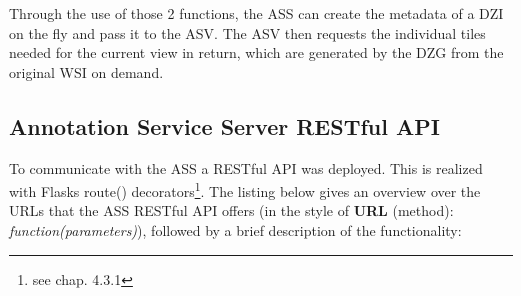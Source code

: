 Through the use of those 2 functions, the ASS can create the metadata of a DZI on the fly and pass it to the ASV. The ASV then requests the individual tiles needed for the current view in return, which are generated by the DZG from the original WSI on demand.


\subsection{Annotation Service Server RESTful API}
To communicate with the ASS a RESTful API was deployed. This is realized with Flasks route() decorators\footnote{see chap. 4.3.1}. The listing below gives an overview over the URLs that the ASS RESTful API offers (in the style of \textbf{URL} (method): \emph{function(parameters)}), followed by a brief description of the functionality:

